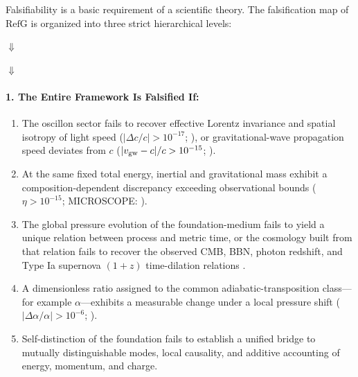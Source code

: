 \documentclass[11pt,a4paper]{article}
\newcommand{\RefG}{\mathrm{RefG}}
\begin{document}
Falsifiability is a basic requirement of a scientific theory. The falsification map of $\RefG$ is organized into three strict hierarchical levels:

\begin{center}

\vspace{0.35em}
$\Downarrow$
\vspace{0.35em}


\vspace{0.35em}
$\Downarrow$
\vspace{0.35em}

\end{center}

\paragraph{1. The Entire Framework Is Falsified If:}
\begin{enumerate}[label=\arabic*.]
\item The oscillon sector fails to recover effective Lorentz invariance and spatial isotropy of light speed ($|\Delta c/c| > 10^{-17}$; \citealt{herrmann2009}), or gravitational-wave propagation speed deviates from $c$ ($|v_{\rm gw} - c|/c > 10^{-15}$; \citealt{abbott2017}).
\item At the same fixed total energy, inertial and gravitational mass exhibit a composition-dependent discrepancy exceeding observational bounds ($\eta > 10^{-15}$; MICROSCOPE: \citealt{touboul2022}).
\item The global pressure evolution of the foundation-medium fails to yield a unique relation between process and metric time, or the cosmology built from that relation fails to recover the observed CMB, BBN, photon redshift, and Type Ia supernova $(1+z)$ time-dilation relations \citep{blondin2008}.
\item A dimensionless ratio assigned to the common adiabatic-transposition class---for example $\alpha$---exhibits a measurable change under a local pressure shift ($|\Delta\alpha/\alpha| > 10^{-6}$; \citealt{kotus2017}).
\item Self-distinction of the foundation fails to establish a unified bridge to mutually distinguishable modes, local causality, and additive accounting of energy, momentum, and charge.
\end{enumerate}
\end{document}
